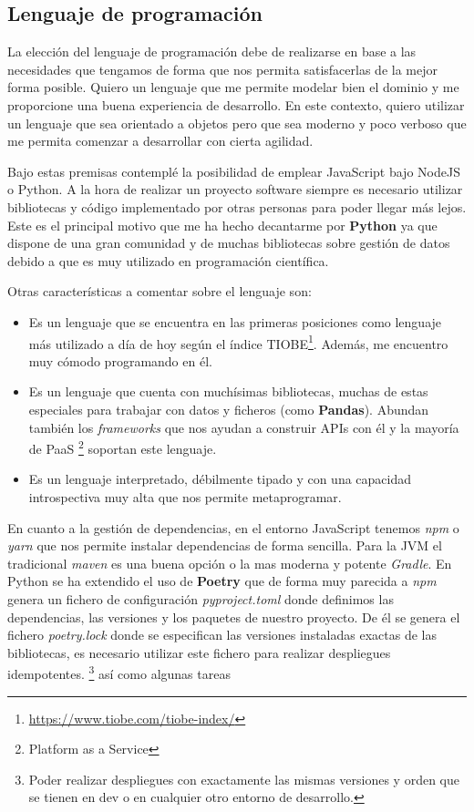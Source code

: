 \subsection{Lenguaje de programación}
La elección del lenguaje de programación debe de realizarse en base a las necesidades que
tengamos de forma que nos permita satisfacerlas de la mejor forma posible. Quiero un
lenguaje que me permite modelar bien el dominio y me proporcione una buena experiencia de
desarrollo. En este contexto, quiero utilizar un lenguaje que sea orientado a objetos pero
que sea moderno y poco verboso que me permita comenzar a desarrollar con cierta agilidad.

Bajo estas premisas contemplé la posibilidad de emplear JavaScript bajo NodeJS o Python. A
la hora de realizar un proyecto software siempre es necesario utilizar bibliotecas y
código implementado por otras personas para poder llegar más lejos. Este es el principal
motivo que me ha hecho decantarme por \textbf{Python} ya que dispone de una gran comunidad
y de muchas bibliotecas sobre gestión de datos debido a que es muy utilizado en
programación científica.

Otras características a comentar sobre el lenguaje son:
\begin{itemize}
    \item Es un lenguaje que se encuentra en las primeras posiciones como lenguaje más
    utilizado a día de hoy según el índice
    TIOBE\footnote{\href{Enlace al índice TIOBE.}{https://www.tiobe.com/tiobe-index/}}. Además, me encuentro muy cómodo
    programando en él.
    \item Es un lenguaje que cuenta con muchísimas bibliotecas, muchas de estas especiales
    para trabajar con datos y ficheros (como \textbf{Pandas}). Abundan también los
    \textit{frameworks} que nos ayudan a construir APIs con él y la mayoría de PaaS
    \footnote{Platform as a Service} soportan este lenguaje.
    \item Es un lenguaje interpretado, débilmente tipado y con una capacidad introspectiva
    muy alta que nos permite metaprogramar.
\end{itemize}

En cuanto a la gestión de dependencias, en el entorno JavaScript tenemos \textit{npm} o
\textit{yarn} que nos permite instalar dependencias de forma sencilla. Para la JVM el
tradicional \textit{maven} es una buena opción o la mas moderna y potente \textit{Gradle}.
En Python se ha extendido el uso de \textbf{Poetry} que de forma muy parecida a
\textit{npm} genera un fichero de configuración \textit{pyproject.toml} donde definimos
las dependencias, las versiones y los paquetes de nuestro proyecto. De él se genera el
fichero \textit{poetry.lock} donde se especifican las versiones instaladas exactas de las
bibliotecas, es necesario utilizar este fichero para realizar despliegues idempotentes.
\footnote{Poder realizar despliegues con exactamente las mismas versiones y orden que se
tienen en dev o en cualquier otro entorno de desarrollo.} así como algunas tareas

